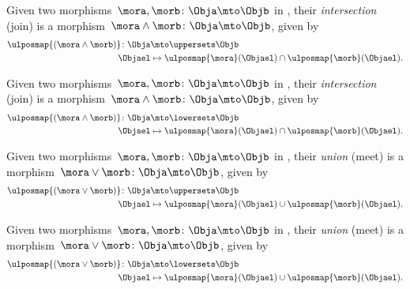 \begin{definition}
    Given two morphisms~$\mora,\morb\colon \Obja \mto \Objb$ in \UPos, their \emph{intersection} (join) is a morphism~$\mora \wedge \morb \colon \Obja \mto \Objb$, given by
    \begin{equation*}
        \begin{aligned}
            \ulposmap{(\mora \wedge \morb)}\colon \Obja &\mto \uppersets \Objb\\
            \Objael&\mapsto \ulposmap{\mora}(\Objael) \cap \ulposmap{\morb}(\Objael).
        \end{aligned}
    \end{equation*}
\end{definition}


\begin{definition}
    Given two morphisms~$\mora,\morb\colon \Obja \mto \Objb$ in \LPos, their \emph{intersection} (join) is a morphism~$\mora \wedge \morb \colon \Obja \mto \Objb$, given by
    \begin{equation*}
        \begin{aligned}
            \ulposmap{(\mora \wedge \morb)}\colon \Obja &\mto \lowersets \Objb\\
            \Objael&\mapsto \ulposmap{\mora}(\Objael) \cap \ulposmap{\morb}(\Objael).
        \end{aligned}
    \end{equation*}
\end{definition}

\begin{definition}
    Given two morphisms~$\mora,\morb\colon \Obja \mto \Objb$ in \UPos, their \emph{union} (meet) is a morphism~$\mora \vee \morb \colon \Obja \mto \Objb$, given by
    \begin{equation*}
        \begin{aligned}
            \ulposmap{(\mora \vee \morb)}\colon \Obja &\mto \uppersets \Objb\\
            \Objael&\mapsto \ulposmap{\mora}(\Objael) \cup \ulposmap{\morb}(\Objael).
        \end{aligned}
    \end{equation*}
\end{definition}

\begin{definition}
    Given two morphisms~$\mora,\morb\colon \Obja \mto \Objb$ in \LPos, their \emph{union} (meet) is a morphism~$\mora \vee \morb \colon \Obja \mto \Objb$, given by
    \begin{equation*}
        \begin{aligned}
            \ulposmap{(\mora \vee \morb)}\colon \Obja &\mto \lowersets \Objb\\
            \Objael&\mapsto \ulposmap{\mora}(\Objael) \cup \ulposmap{\morb}(\Objael).
        \end{aligned}
    \end{equation*}
\end{definition}

